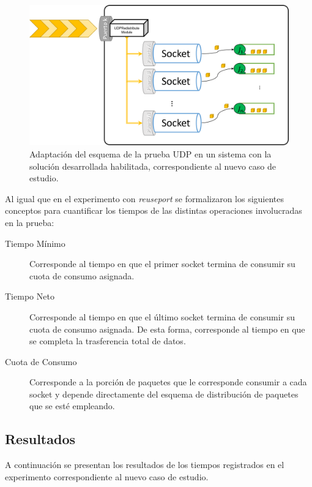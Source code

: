 \begin{figure}[!h]
	\centering
	\includegraphics[scale=.5]{imagenes/adaptacioncasoestudio.png}
	\caption{Adaptación del esquema de la prueba UDP en un sistema con la solución desarrollada habilitada, correspondiente al nuevo caso de estudio.}
	\label{fig:casoPruebaModulo}
\end{figure}

Al igual que en el experimento con \emph{reuseport} se formalizaron los siguientes conceptos para cuantificar los tiempos de las distintas operaciones involucradas en la prueba:

\begin{description}
\item[Tiempo Mínimo] Corresponde al tiempo en que el primer socket termina de consumir su cuota de consumo asignada.
\item[Tiempo Neto] Corresponde al tiempo en que el último socket termina de consumir su cuota de consumo asignada. De esta forma, corresponde al tiempo en que se completa la trasferencia total de datos.
\item[Cuota de Consumo] Corresponde a la porción de paquetes que le corresponde consumir a cada socket y depende directamente del esquema de distribución de paquetes que se esté empleando.
\end{description}

\subsection{Resultados}
A continuación se presentan los resultados de los tiempos registrados en el experimento correspondiente al nuevo caso de estudio.

